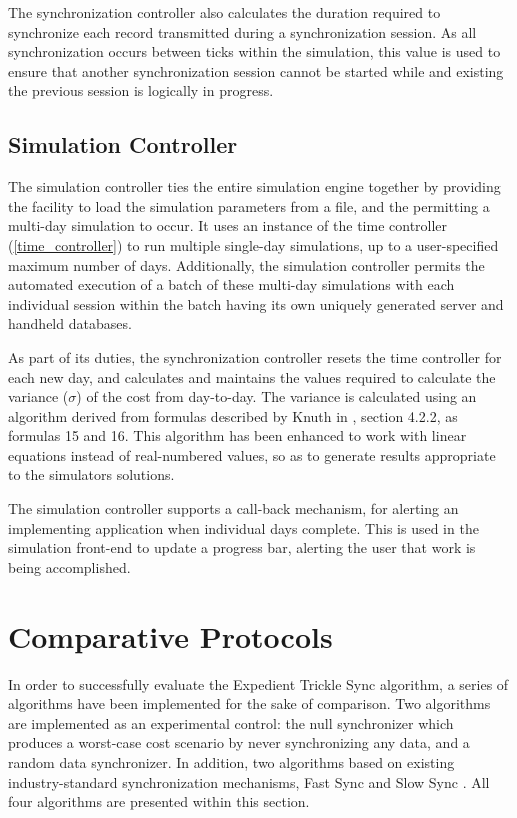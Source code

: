The synchronization controller also calculates the duration required to synchronize each record transmitted during a synchronization session.  As all synchronization occurs between ticks within the simulation, this value is used to ensure that another synchronization session cannot be started while and existing the previous session is logically in progress.

\subsection{Simulation Controller}\label{simcontroller}

The simulation controller ties the entire simulation engine together by providing the facility to load the simulation parameters from a file, and the permitting a multi-day simulation to occur.  It uses an instance of the time controller (\ref{time_controller}) to run multiple single-day simulations, up to a user-specified maximum number of days.  Additionally, the simulation controller permits the automated execution of a batch of these multi-day simulations with each individual session within the batch having its own uniquely generated server and handheld databases.

As part of its duties, the synchronization controller resets the time controller for each new day, and calculates and maintains the values required to calculate the variance ($\sigma$) of the cost from day-to-day.  The variance is calculated using an algorithm derived from formulas described by Knuth in \cite{RefWorks:42}, section 4.2.2, as formulas 15 and 16.  This algorithm has been enhanced to work with linear equations instead of real-numbered values, so as to generate results appropriate to the simulators solutions.

The simulation controller supports a call-back mechanism, for alerting an implementing application when individual days complete.  This is used in the simulation front-end to update a progress bar, alerting the user that work is being accomplished.

\section{Comparative Protocols}\label{protocols}

In order to successfully evaluate the Expedient Trickle Sync algorithm, a series of algorithms have been implemented for the sake of comparison.  Two algorithms are implemented as an experimental control:  the null synchronizer which produces a worst-case cost scenario by never synchronizing any data, and a random data synchronizer.  In addition, two algorithms based on existing industry-standard synchronization mechanisms, Fast Sync \cite{RefWorks:2, RefWorks:22, RefWorks:31} and Slow Sync \cite{RefWorks:1, RefWorks:2, RefWorks:24, RefWorks:31}.  All four algorithms are presented within this section.

